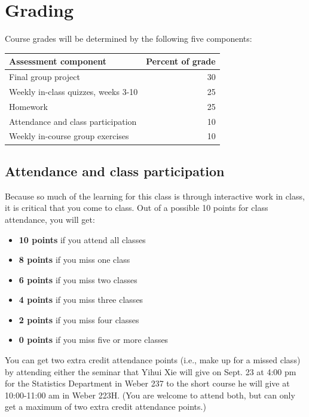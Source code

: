 \documentclass[]{book}
\providecommand{\tightlist}{%
  \setlength{\itemsep}{0pt}\setlength{\parskip}{0pt}}
\begin{document}
\section{Grading}\label{grading}

Course grades will be determined by the following five components:

\begin{tabular}{l|r}
\hline
Assessment component & Percent of grade\\
\hline
Final group project & 30\\
\hline
Weekly in-class quizzes, weeks 3-10 & 25\\
\hline
Homework & 25\\
\hline
Attendance and class participation & 10\\
\hline
Weekly in-course group exercises & 10\\
\hline
\end{tabular}

\subsection{Attendance and class
participation}\label{attendance-and-class-participation}

Because so much of the learning for this class is through interactive
work in class, it is critical that you come to class. Out of a possible
10 points for class attendance, you will get:

\begin{itemize}
\tightlist
\item
  \textbf{10 points} if you attend all classes
\item
  \textbf{8 points} if you miss one class
\item
  \textbf{6 points} if you miss two classes
\item
  \textbf{4 points} if you miss three classes
\item
  \textbf{2 points} if you miss four classes
\item
  \textbf{0 points} if you miss five or more classes
\end{itemize}

You can get two extra credit attendance points (i.e., make up for a
missed class) by attending either the seminar that Yihui Xie will give
on Sept. 23 at 4:00 pm for the Statistics Department in Weber 237 to the
short course he will give at 10:00-11:00 am in Weber 223H. (You are
welcome to attend both, but can only get a maximum of two extra credit
attendance points.)
\end{document}
